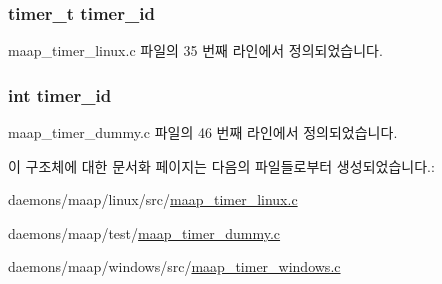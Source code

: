 \subsubsection[{\texorpdfstring{timer\+\_\+id}{timer_id}}]{\setlength{\rightskip}{0pt plus 5cm}timer\+\_\+t timer\+\_\+id}\hypertarget{structmaap__timer_a1a6464bea38bc810aeb0aed8f14b5dc0}{}\label{structmaap__timer_a1a6464bea38bc810aeb0aed8f14b5dc0}


maap\+\_\+timer\+\_\+linux.\+c 파일의 35 번째 라인에서 정의되었습니다.

\subsubsection[{\texorpdfstring{timer\+\_\+id}{timer_id}}]{\setlength{\rightskip}{0pt plus 5cm}int timer\+\_\+id}\hypertarget{structmaap__timer_a724d31681653653604a2b744c259cd16}{}\label{structmaap__timer_a724d31681653653604a2b744c259cd16}


maap\+\_\+timer\+\_\+dummy.\+c 파일의 46 번째 라인에서 정의되었습니다.



이 구조체에 대한 문서화 페이지는 다음의 파일들로부터 생성되었습니다.\+:\begin{DoxyCompactItemize}
\item 
daemons/maap/linux/src/\hyperlink{maap__timer__linux_8c}{maap\+\_\+timer\+\_\+linux.\+c}\item 
daemons/maap/test/\hyperlink{maap__timer__dummy_8c}{maap\+\_\+timer\+\_\+dummy.\+c}\item 
daemons/maap/windows/src/\hyperlink{maap__timer__windows_8c}{maap\+\_\+timer\+\_\+windows.\+c}\end{DoxyCompactItemize}

